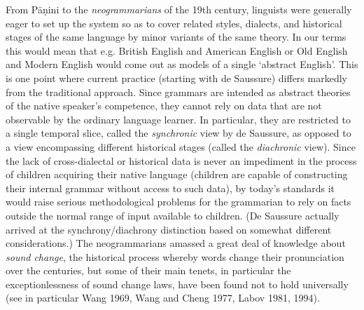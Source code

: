 {From P\={a}\d{n}ini to the {\it neogrammarians} of the 19th century, linguists
were generally eager to set up the system so as to cover related styles,
dialects, and historical stages of the same language by minor variants of the
same theory. In our terms this would mean that e.g. British English and
American English or Old English and Modern English would come out as models of
a single `abstract English'.  This is one point where current practice
(starting with de Saussure) differs markedly from the traditional approach.
Since grammars are intended as abstract theories of the native speaker's
competence, they cannot rely on data that are not observable by the ordinary
language learner. In particular, they are restricted to a single temporal
slice, called the {\it synchronic} view by de Saussure, as opposed to a view
encompassing different historical stages (called the {\it diachronic}
view). Since the lack of cross-dialectal or
historical data is never an impediment in the process of children acquiring
their native language (children are capable of constructing their internal
grammar without access to such data), by today's standards it would raise
serious methodological problems for the grammarian to rely on facts outside
the normal range of input available to children. (De Saussure actually arrived
at the synchrony/diachrony distinction based on somewhat different
considerations.)  The neogrammarians amassed a great deal of knowledge about
{\it sound change}, the historical process whereby words
change their pronunciation over the centuries, but some of their main tenets,
in particular the exceptionlessness of sound change laws, have been found not
to hold universally (see in particular Wang 1969, Wang and Cheng 1977, Labov
1981, 1994).\nocite{Wang:1969}\nocite{Wang:1977}\nocite{Labov:1981}
\nocite{Labov:1994}  
  
 

}
